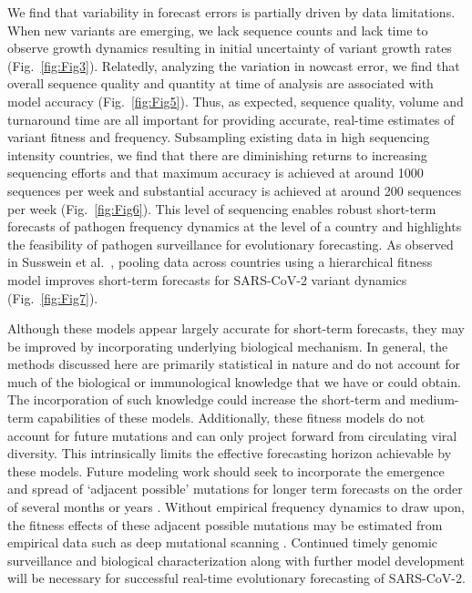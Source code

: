 \documentclass[10pt,letterpaper]{article}
\begin{document}
We find that variability in forecast errors is partially driven by data limitations.
When new variants are emerging, we lack sequence counts and lack time to observe growth dynamics resulting in initial uncertainty of variant growth rates (Fig.~\ref{fig:Fig3}).
Relatedly, analyzing the variation in nowcast error, we find that overall sequence quality and quantity at time of analysis are associated with model accuracy (Fig.~\ref{fig:Fig5}).
Thus, as expected, sequence quality, volume and turnaround time are all important for providing accurate, real-time estimates of variant fitness and frequency.
Subsampling existing data in high sequencing intensity countries, we find that there are diminishing returns to increasing sequencing efforts and that maximum accuracy is achieved at around 1000 sequences per week and substantial accuracy is achieved at around 200 sequences per week (Fig.~\ref{fig:Fig6}).
This level of sequencing enables robust short-term forecasts of pathogen frequency dynamics at the level of a country and highlights the feasibility of pathogen surveillance for evolutionary forecasting.
As observed in Susswein et al.\ \cite{susswein2023leveraging}, pooling data across countries using a hierarchical fitness model improves short-term forecasts for SARS-CoV-2 variant dynamics (Fig.~\ref{fig:Fig7}).


Although these models appear largely accurate for short-term forecasts, they may be improved by incorporating underlying biological mechanism.
In general, the methods discussed here are primarily statistical in nature and do not account for much of the biological or immunological knowledge that we have or could obtain.
The incorporation of such knowledge could increase the short-term and medium-term capabilities of these models.
Additionally, these fitness models do not account for future mutations and can only project forward from circulating viral diversity.
This intrinsically limits the effective forecasting horizon achievable by these models.
Future modeling work should seek to incorporate the emergence and spread of `adjacent possible' mutations for longer term forecasts on the order of several months or years \cite{kauffman1993origins}.
Without empirical frequency dynamics to draw upon, the fitness effects of these adjacent possible mutations may be estimated from empirical data such as deep mutational scanning \cite{cao2022ba, greaney2022antibody, dadonaite2023full}.
Continued timely genomic surveillance and biological characterization along with further model development will be necessary for successful real-time evolutionary forecasting of SARS-CoV-2.
\end{document}
